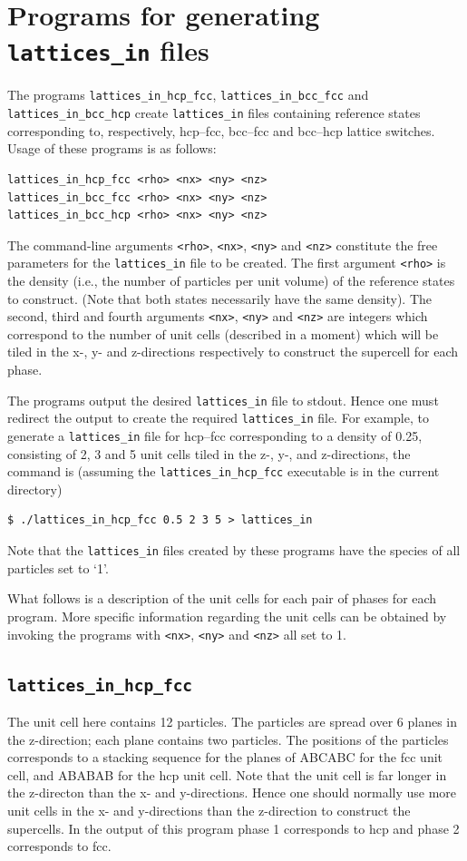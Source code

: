 \documentclass{report}
\begin{document}
\section{Programs for generating \texttt{lattices\_in} files}\label{sec:lattices_in_programs}
The programs \texttt{lattices\_in\_hcp\_fcc}, \texttt{lattices\_in\_bcc\_fcc} and \texttt{lattices\_in\_bcc\_hcp} 
create \texttt{lattices\_in} files containing reference states corresponding to, respectively, hcp--fcc, bcc--fcc and bcc--hcp lattice switches.
Usage of these programs is as follows:
\begin{verbatim}
lattices_in_hcp_fcc <rho> <nx> <ny> <nz>
lattices_in_bcc_fcc <rho> <nx> <ny> <nz>
lattices_in_bcc_hcp <rho> <nx> <ny> <nz>
\end{verbatim}
The command-line arguments \texttt{<rho>}, \texttt{<nx>}, \texttt{<ny>} and \texttt{<nz>} constitute the free parameters for the 
\texttt{lattices\_in} file to be created.
The first argument \texttt{<rho>} is the density (i.e., the number of particles per unit volume) of the reference states to
construct. (Note that both states necessarily have the same density). The second, third and fourth arguments \texttt{<nx>}, 
\texttt{<ny>} and \texttt{<nz>} are integers which correspond to the number of unit cells (described in a moment) which will 
be tiled in the x-, y- and z-directions respectively to construct the supercell for each phase. 

The programs output the desired \texttt{lattices\_in} file to stdout. Hence one must redirect the output
to create the required \texttt{lattices\_in} file.
For example, to generate a \texttt{lattices\_in} file for hcp--fcc corresponding to a density of 0.25, consisting
of 2, 3 and 5 unit cells tiled in the z-, y-, and z-directions, the command is (assuming the \texttt{lattices\_in\_hcp\_fcc} executable
is in the current directory)
\begin{verbatim}
$ ./lattices_in_hcp_fcc 0.5 2 3 5 > lattices_in
\end{verbatim}
Note that the \texttt{lattices\_in} files created by these programs have the species of all particles set to `1'.

What follows is a description of the unit cells for each pair of phases for each program. More specific information regarding the unit
cells can be obtained by invoking the programs with \texttt{<nx>}, \texttt{<ny>} and \texttt{<nz>} all set to 1. 

\subsection{\texttt{lattices\_in\_hcp\_fcc}}
The unit cell here contains 12 particles. The particles are spread over 6 planes in the z-direction; each plane contains two particles. The positions
of the particles corresponds to a stacking sequence for the planes of ABCABC for the fcc unit cell, and  ABABAB for the hcp unit cell. 
Note that the unit cell is far longer in the z-directon than the x- and y-directions. Hence one should normally use more unit cells in 
the x- and y-directions than the z-direction to construct the supercells. In the output of this program phase 1 corresponds to hcp and
phase 2 corresponds to fcc.
\end{document}

